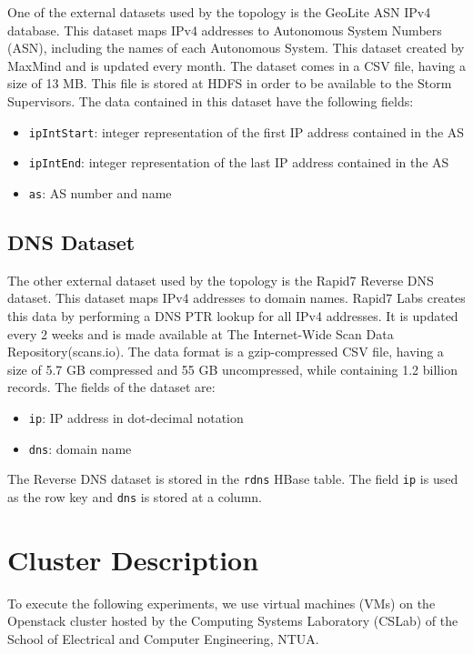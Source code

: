 One of the external datasets used by the topology is the GeoLite ASN IPv4 database. This dataset maps IPv4 addresses to Autonomous System Numbers (ASN), including the names of each Autonomous System. This dataset created by MaxMind and is updated every month. The dataset comes in a CSV file, having a size  of 13 MB. This file is stored at HDFS in order to be available to the Storm Supervisors. The data contained in this dataset have the following fields:
\begin{itemize}
\item \texttt{ipIntStart}: integer representation of the first IP address contained in the AS
\item \texttt{ipIntEnd}: integer representation of the last IP address contained in the AS
\item \texttt{as}: AS number and name
\end{itemize}

\subsection{DNS Dataset}\label{subsection:benchmarks_dns_dataset}

The other external dataset used by the topology is the Rapid7 Reverse DNS dataset. This dataset maps IPv4 addresses to domain names. Rapid7 Labs creates this data by performing a DNS PTR lookup for all IPv4 addresses. It is updated every 2 weeks and is made available at The Internet-Wide Scan Data Repository(scans.io). The data format is a gzip-compressed CSV file, having a size of 5.7 GB compressed and 55 GB uncompressed, while containing 1.2 billion records. The fields of the dataset are:
\begin{itemize}
\item \texttt{ip}: IP address in dot-decimal notation
\item \texttt{dns}: domain name
\end{itemize}

The Reverse DNS dataset is stored in the \texttt{rdns} HBase table. The field \texttt{ip} is used as the row key and \texttt{dns} is stored at a column.


\section{Cluster Description}

To execute the following experiments, we use virtual machines (VMs) on the Openstack cluster hosted by the Computing Systems Laboratory (CSLab) of the School of Electrical and Computer Engineering, NTUA. 

